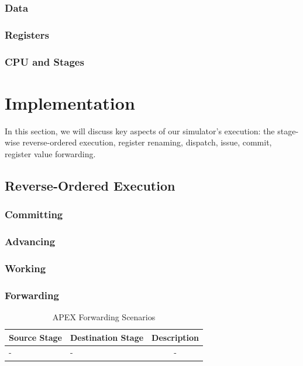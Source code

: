\documentclass[12pt]{article}
\begin{document}
\subsubsection{Data}

\subsubsection{Registers}

\subsubsection{CPU and Stages}


\section{Implementation}
\label{sec:implementation}
In this section, we will discuss key aspects of our simulator's execution: the stage-wise reverse-ordered execution, register renaming, dispatch, issue, commit, register value forwarding.

\subsection{Reverse-Ordered Execution}

\subsubsection{Committing}


\subsubsection{Advancing}

\subsubsection{Working}

\subsubsection{Forwarding}
\begin{table}
  \centering
  \caption{APEX Forwarding Scenarios}
  \label{tab:fwdscenarios}
  \begin{tabular}{l|l|c}
    Source Stage & Destination Stage & Description\\
    \hline
    - & - & - \\
  \end{tabular}
\end{table}
\end{document}
